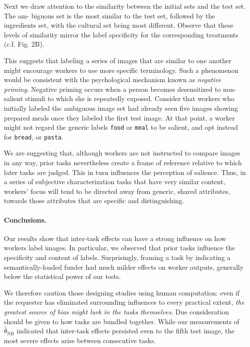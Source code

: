 \documentclass[12pt]{article}
\begin{document}
Next we draw attention to the similarity between the initial sets and the test 
set. The am- biguous set is the most similar to the test set, followed by the 
ingredients set, with the cultural set being most different. Observe that these
levels of similarity mirror the label specificity for the corresponding 
treatments (c.f. Fig. 2B).

This suggests that labeling a series of images that are similar to one another 
might encourage workers to use more specific terminology. Such a phenomenon 
would be consistent with the psychological mechanism known as 
\textit{negative priming}.
Negative priming occurs when a person becomes desensitized to non-salient 
stimuli to which she is repeatedly exposed. Consider that workers who 
initially labeled the ambiguous image set had already seen five images 
showing prepared meals once they labeled the first test image. At that point, 
a worker might not regard the generic labels \texttt{food} or \texttt{meal} to 
be salient, and opt instead for \texttt{bread}, or \texttt{pasta}.
 
We are suggesting that, although workers are not instructed to compare images 
in any way, prior tasks nevertheless create a frame of reference relative to 
which later tasks are judged. This in turn influences the perception of 
salience. Thus, in a series of subjective characterization tasks that have 
very similar content, workers' focus will tend to be directed away from 
generic, shared attributes, towards those attributes that are specific and 
distinguishing.

\paragraph{Conclusions.}
Our results show that inter-task effects can have a strong influence on how 
workers label images. In particular, we observed that prior tasks influence 
the specificity and content of labels. Surprisingly, framing a task by 
indicating a semantically-loaded funder had much milder effects on worker 
outputs, generally below the statistical power of our tests.

We therefore caution those designing studies using human computation: even if 
the requester has eliminated surrounding influences to every practical extent, 
\textit{the greatest source of bias might lurk in the tasks themselves}. Due 
consideration should be given to how tasks are bundled together. While our 
measurements of $\hat{\theta}_\mathrm{NB}$ indicated that inter-task effects 
persisted even to the fifth test image, the most severe effects arise between 
consecutive tasks.
\end{document}

